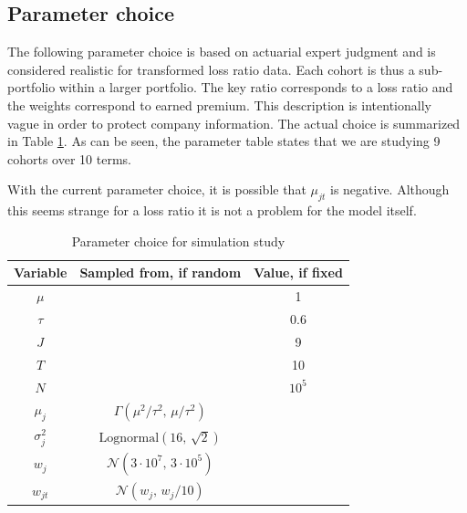 \documentclass[11pt]{article}
\theoremstyle{definition}
\begin{document}
\subsection{Parameter choice}
The following parameter choice is based on actuarial expert judgment and is considered realistic for transformed loss ratio data. Each cohort is thus a sub-portfolio within a larger portfolio. The key ratio corresponds to a loss ratio and the weights correspond to earned premium. This description is intentionally vague in order to protect company information. The actual choice is summarized in Table \ref{tab:parameters}. As can be seen, the parameter table states that we are studying 9 cohorts over 10 terms. 

With the current parameter choice, it is possible that $\mu_{jt}$ is negative. Although this seems strange for a loss ratio it is not a problem for the model itself.

\begin{table}[H]
\centering
\caption{Parameter choice for simulation study}
\label{tab:parameters}
\begin{tabular}{ccc}
\hline
Variable     & Sampled from, if random  & Value, if fixed \\ \hline
$\mu$ && 1 \\
$\tau$ && 0.6 \\
$J$ && 9 \\
$T$ && 10 \\
$N$ && $10^5$ \\
$\mu_j$ & $\Gamma (\mu^2/\tau^2,\, \mu/\tau^2)$ &\\
$\sigma_j^2$ &  $\text{Lognormal}(16,\, \sqrt{2})$ &\\
$w_j$ & $\mathcal{N}(3\cdot 10^7,\, 3\cdot 10^5)$ &\\
$w_{jt}$ & $\mathcal{N}(w_j,\, w_j/10)$& \\
\hline
\end{tabular}
\end{table}
\end{document}
